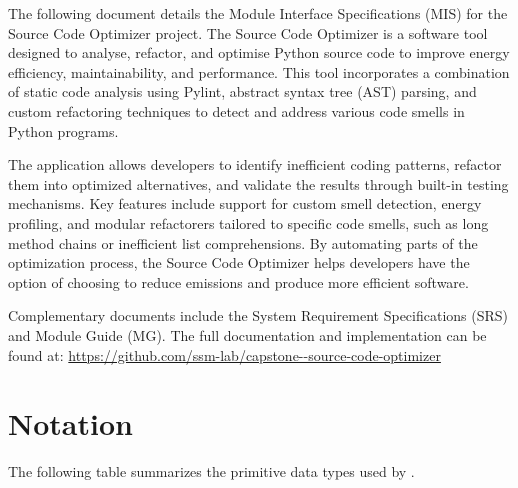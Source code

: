 \documentclass[12pt, titlepage]{article}
\begin{document}
The following document details the Module Interface Specifications (MIS) for the Source Code Optimizer project. The Source Code Optimizer is a software tool designed to analyse, refactor, and optimise Python source code to improve energy efficiency, maintainability, and performance. This tool incorporates a combination of static code analysis using Pylint, abstract syntax tree (AST) parsing, and custom refactoring techniques to detect and address various code smells in Python programs.

The application allows developers to identify inefficient coding patterns, refactor them into optimized alternatives, and validate the results through built-in testing mechanisms. Key features include support for custom smell detection, energy profiling, and modular refactorers tailored to specific code smells, such as long method chains or inefficient list comprehensions. By automating parts of the optimization process, the Source Code Optimizer helps developers have the option of choosing to reduce emissions and produce more efficient software.

Complementary documents include the System Requirement Specifications (SRS) and Module Guide (MG). The full documentation and implementation can be found at: \url{https://github.com/ssm-lab/capstone--source-code-optimizer}

\section{Notation}

The following table summarizes the primitive data types used by \progname. 
\end{document}
